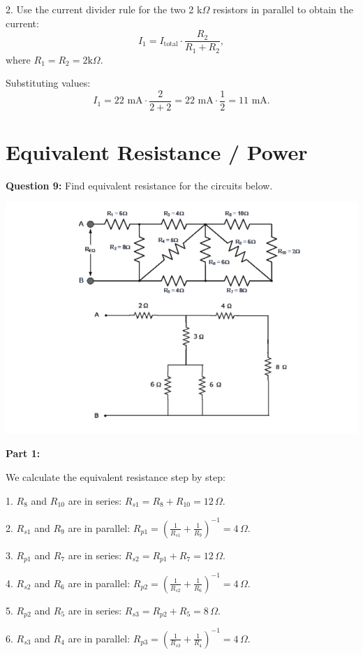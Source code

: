 \documentclass{article}
\begin{document}
2. Use the current divider rule for the two 2 k$\Omega$ resistors in parallel to obtain the current:
\[
I_1 = I_{\text{total}} \cdot \frac{R_2}{R_1 + R_2},
\]
where \( R_1 = R_2 = 2 \text{k}\Omega \).

Substituting values:
\[
I_1 = 22 \text{ mA} \cdot \frac{2}{2 + 2} = 22 \text{ mA} \cdot \frac{1}{2} = 11 \text{ mA}.
\]

\section*{Equivalent Resistance / Power}
\textbf{Question 9:} Find equivalent resistance for the circuits below.

\begin{center}

        \includegraphics[width=0.75\linewidth]{figures/image.png}
\end{center}

\textbf{Part 1:}

We calculate the equivalent resistance step by step:

1. \( R_8 \) and \( R_{10} \) are in series:  
   \( R_{s1} = R_8 + R_{10} = 12 \, \Omega \).

2. \( R_{s1} \) and \( R_9 \) are in parallel:  
   \( R_{p1} = \left( \frac{1}{R_{s1}} + \frac{1}{R_9} \right)^{-1} = 4 \, \Omega \).

3. \( R_{p1} \) and \( R_7 \) are in series:  
   \( R_{s2} = R_{p1} + R_7 = 12 \, \Omega \).

4. \( R_{s2} \) and \( R_6 \) are in parallel:  
   \( R_{p2} = \left( \frac{1}{R_{s2}} + \frac{1}{R_6} \right)^{-1} = 4 \, \Omega \).

5. \( R_{p2} \) and \( R_5 \) are in series:  
   \( R_{s3} = R_{p2} + R_5 = 8 \, \Omega \).

6. \( R_{s3} \) and \( R_4 \) are in parallel:  
   \( R_{p3} = \left( \frac{1}{R_{s3}} + \frac{1}{R_4} \right)^{-1} = 4 \, \Omega \).
\end{document}
